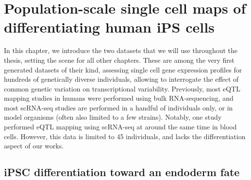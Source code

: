 
\chapter{Population-scale single cell maps of differentiating human iPS cells}

In this chapter, we introduce the two datasets that we will use throughout the thesis, setting the scene for all other chapters. 
These are among the very first generated datasets of their kind, assessing single cell gene expression profiles for hundreds of genetically diverse individuals, allowing to interrogate the effect of common genetic variation on transcriptional variability.
Previously, most eQTL mapping studies in humans were performed using bulk RNA-sequencing, and most scRNA-seq studies are performed in a handful of individuals only, or in model organisms (often also limited to a few strains).
Notably, one study performed eQTL mapping using scRNA-seq \cite{van2018single} at around the same time in blood cells. However, this data is limited to 45 individuals, and lacks the differentiation aspect of our works.

\section{iPSC differentiation toward an endoderm fate}

